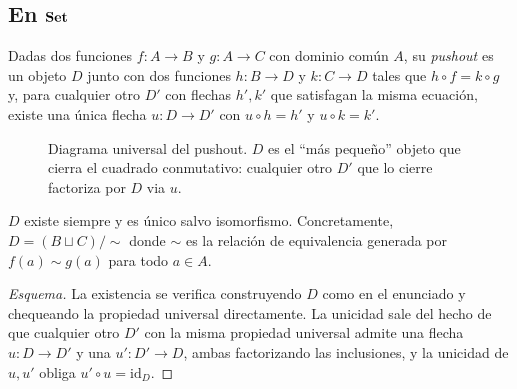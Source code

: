 \subsection*{En $\mathbf{Set}$}

\begin{defn}
\label{def:pushout-set-prelim}
Dadas dos funciones $f: A \to B$ y $g: A \to C$ con dominio común $A$,
su \emph{pushout} es un objeto $D$ junto con dos funciones $h: B \to
D$ y $k: C \to D$ tales que $h \circ f = k \circ g$ y, para cualquier
otro $D'$ con flechas $h', k'$ que satisfagan la misma ecuación, existe
una única flecha $u: D \to D'$ con $u \circ h = h'$ y $u \circ k = k'$.
\end{defn}

\begin{figure}[h]
\centering
{}
\caption{Diagrama universal del pushout. $D$ es el ``más pequeño''
objeto que cierra el cuadrado conmutativo: cualquier otro $D'$ que lo
cierre factoriza por $D$ via $u$.}
\label{fig:pushout-prelim}
\end{figure}

\begin{teorema}
\label{teo:pushout-set-construccion}
$D$ existe siempre y es único salvo isomorfismo. Concretamente,
$D = (B \sqcup C)/\sim$ donde $\sim$ es la relación de equivalencia
generada por $f(a) \sim g(a)$ para todo $a \in A$.
\end{teorema}

\begin{proof}[Esquema]
La existencia se verifica construyendo $D$ como en el enunciado y
chequeando la propiedad universal directamente. La unicidad sale del
hecho de que cualquier otro $D'$ con la misma propiedad universal
admite una flecha $u: D \to D'$ y una $u': D' \to D$, ambas
factorizando las inclusiones, y la unicidad de $u, u'$ obliga
$u' \circ u = \mathrm{id}_D$.
\end{proof}

